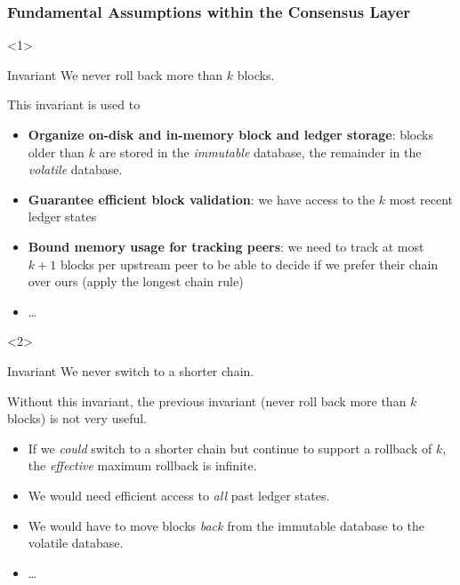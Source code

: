 \documentclass[usenames,dvipsnames,t]{beamer}
\begin{document}
\begin{frame}
\frametitle{Fundamental Assumptions within the Consensus Layer}


\begin{onlyenv}<1>

\begin{alertblock}{Invariant}
We never roll back more than $k$ blocks.
\end{alertblock}

This invariant is used to

\begin{itemize}
\item \textbf{Organize on-disk and in-memory block and ledger storage}: blocks older
than $k$ are stored in the \emph{immutable} database, the remainder in the
\emph{volatile} database.
\item \textbf{Guarantee efficient block validation}: we have access to the $k$
most recent ledger states
\item \textbf{Bound memory usage for tracking peers}: we need to track at most $k + 1$
blocks per upstream peer to be able to decide if we prefer their chain over
ours (apply the longest chain rule)
\item \dots
\end{itemize}

\end{onlyenv}


\begin{onlyenv}<2>
\begin{alertblock}{Invariant}
We never switch to a shorter chain.
\end{alertblock}

\pause

Without this invariant, the previous invariant (never roll back
more than $k$ blocks) is not very useful.

\begin{itemize}
\item If we \emph{could} switch to a shorter chain but continue to support a
rollback of $k$, the \emph{effective} maximum rollback is infinite.
\item We would need efficient access to \emph{all} past ledger states.
\item We would have to move blocks \emph{back} from the immutable database to the volatile database.
\item \dots
\end{itemize}
\end{onlyenv}


\end{frame}
\end{document}
